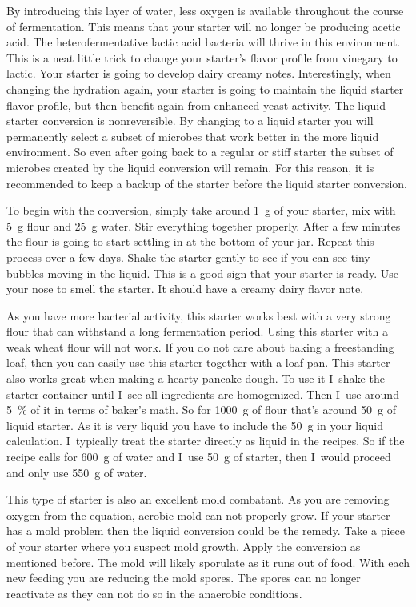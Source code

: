 By introducing this layer of water, less oxygen is available throughout the
course of fermentation. This means that your starter will no longer be
producing acetic acid. The heterofermentative lactic acid bacteria will thrive
in this environment. This is a neat little trick to change your starter's
flavor profile from vinegary to lactic. Your starter is going to develop
dairy creamy notes. Interestingly, when changing the hydration again, your starter
is going to maintain the liquid starter flavor profile, but then benefit again
from enhanced yeast activity. The liquid starter conversion is nonreversible.
By changing to a liquid starter you will permanently select a subset of
microbes that work better in the more liquid environment. So even after going back to a regular
or stiff starter the subset of microbes created by the liquid conversion
will remain. For this reason, it is recommended to keep a backup of the starter
before the liquid starter conversion.

To begin with the
conversion, simply take around \qty{1}{\gram} of your starter, mix with \qty{5}{\gram} flour and
\qty{25}{\gram} water. Stir everything together properly. After a few minutes the flour is
going to start settling in at the bottom of your jar. Repeat this process over
a few days. Shake the starter gently to see if you can see tiny  bubbles
moving in the liquid. This is a good sign that your starter is ready. Use your
nose to smell the starter. It should have a creamy dairy flavor note.

As you have more bacterial activity, this starter works best with a very strong
flour that can withstand a long fermentation period. Using this starter with a
weak wheat flour will not work. If you do not care about baking a freestanding loaf,
then you can easily use this starter together with a loaf pan.
This starter also works great when making a hearty pancake dough. To use it
I~shake the starter container until I~see all ingredients are homogenized.  Then
I~use around \qty{5}{\percent} of it in terms of baker's math. So for \qty{1000}{\gram} of flour
that's around \qty{50}{\gram} of liquid starter. As it is very liquid you have to
include the \qty{50}{\gram} in your liquid calculation. I~typically treat the starter
directly as liquid in the recipes. So if the recipe calls for \qty{600}{\gram} of water
and I~use \qty{50}{\gram} of starter, then I~would proceed and only use \qty{550}{\gram} of
water.

This type of starter is also an excellent mold combatant. As you are removing
oxygen from the equation, aerobic mold can not properly grow. If your starter
has a mold problem then the liquid conversion could be the remedy. Take a
piece of your starter where you suspect mold growth. Apply the conversion
as mentioned before. The mold will likely sporulate as it runs out of food.
With each new feeding you are reducing the mold spores. The spores can no
longer reactivate as they can not do so in the anaerobic conditions.

